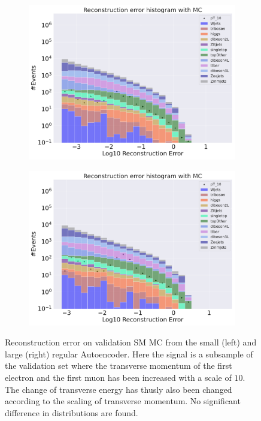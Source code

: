 \begin{figure}[H]
    \centering
    \begin{subfigure}{.45\textwidth}
        \includegraphics[width=\textwidth]{Figures/AE_testing/small/b_data_recon_big_rm3_feats_sig_pT_10.pdf}
        \caption{}
        \label{fig:ae_small_pt_10}
    \end{subfigure}
    \hfill 
    \begin{subfigure}{.45\textwidth}
        \includegraphics[width=\textwidth]{Figures/AE_testing/big/b_data_recon_big_rm3_feats_sig_pT_10.pdf}
        \caption{}
        \label{fig:ae_big_pt_10}
    \end{subfigure}
    \hfill 
    \caption[AE | Reconstruction error $p_T$ altering of 10]{Reconstruction error on validation SM MC from the small (left) and large (right) regular Autoencoder. Here the signal is a subsample of the validation 
    set where the transverse momentum of the first electron and the first muon has been increased with a scale of $10$. The change of transverse 
    energy has thusly also been changed according to the scaling of transverse momentum. No significant difference in distributions are found. }
    \label{fig:ae_big_small_pt_10}
\end{figure}



